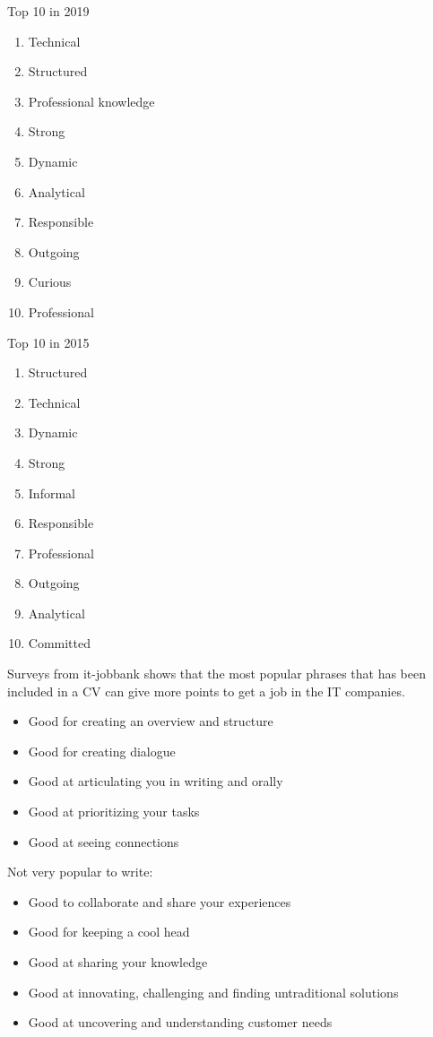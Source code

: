 Top 10 in 2019
\begin{enumerate}

\item Technical
\item Structured
\item Professional knowledge
\item Strong
\item Dynamic
\item Analytical
\item Responsible
\item Outgoing
\item Curious
\item Professional
\end{enumerate}

Top 10 in 2015
\begin{enumerate}

\item Structured
\item Technical
\item Dynamic
\item Strong
\item Informal
\item Responsible
\item Professional
\item Outgoing
\item Analytical
\item Committed
\end{enumerate}

Surveys from it-jobbank shows that the most popular phrases
that has been included in a CV can give more points to get a job in the IT companies.
\begin{itemize}
\item Good for creating an overview and structure
\item Good for creating dialogue
\item Good at articulating you in writing and orally
\item Good at prioritizing your tasks
\item Good at seeing connections
\end{itemize}

Not very popular to write:
\begin{itemize}
\item Good to collaborate and share your experiences
\item Good for keeping a cool head
\item Good at sharing your knowledge
\item Good at innovating, challenging and finding untraditional solutions
\item Good at uncovering and understanding customer needs
\end{itemize}

